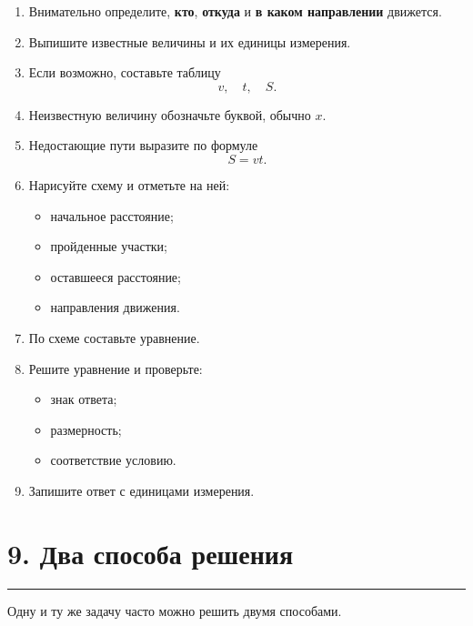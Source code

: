 \documentclass[a4paper,12pt]{article}
\newcommand{\sectionline}{
    \vspace{-0.2em}
    {\color{linegray}\rule{\linewidth}{0.5pt}}
    \vspace{0.5em}
}
\newcommand{\key}[1]{\textcolor{darkaccent}{\textbf{#1}}}
\begin{document}
\begin{enumerate}[label=\textbf{\arabic*.}]
    \item Внимательно определите, \key{кто}, \key{откуда} и
    \key{в каком направлении} движется.

    \item Выпишите известные величины и их единицы измерения.

    \item Если возможно, составьте таблицу
    \[
    v,\quad t,\quad S.
    \]

    \item Неизвестную величину обозначьте буквой, обычно \(x\).

    \item Недостающие пути выразите по формуле
    \[
    S=vt.
    \]

    \item Нарисуйте схему и отметьте на ней:
    \begin{itemize}
        \item начальное расстояние;
        \item пройденные участки;
        \item оставшееся расстояние;
        \item направления движения.
    \end{itemize}

    \item По схеме составьте уравнение.

    \item Решите уравнение и проверьте:
    \begin{itemize}
        \item знак ответа;
        \item размерность;
        \item соответствие условию.
    \end{itemize}

    \item Запишите ответ с единицами измерения.
\end{enumerate}


\section*{\textcolor{darkaccent}{9. Два способа решения}}

\sectionline

Одну и ту же задачу часто можно решить двумя способами.
\end{document}
